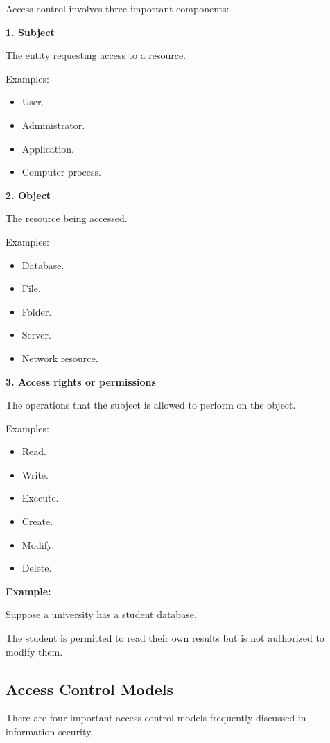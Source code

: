 Access control involves three important components:

\textbf{1. Subject}

The entity requesting access to a resource.

Examples:

\begin{itemize}
\item User.
\item Administrator.
\item Application.
\item Computer process.
\end{itemize}

\textbf{2. Object}

The resource being accessed.

Examples:

\begin{itemize}
\item Database.
\item File.
\item Folder.
\item Server.
\item Network resource.
\end{itemize}

\textbf{3. Access rights or permissions}

The operations that the subject is allowed to perform on the object.

Examples:

\begin{itemize}
\item Read.
\item Write.
\item Execute.
\item Create.
\item Modify.
\item Delete.
\end{itemize}

\textbf{Example:}

Suppose a university has a student database.


The student is permitted to read their own results but is not authorized to modify them.

\subsection{Access Control Models}

There are four important access control models frequently discussed in information security.

